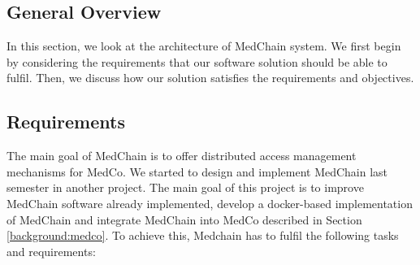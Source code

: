 \subsection{General Overview} \label{arch:general Overview}
In this section, we look at the architecture of MedChain system. We first begin by considering the requirements that our software solution should be able to fulfil. Then, we discuss how our solution satisfies the requirements and objectives. 




\subsection{Requirements} \label{arch:requirements}

The main goal of MedChain is to offer distributed access management mechanisms for MedCo. We started to design and implement MedChain last semester in another project. The main goal of this project is to improve MedChain software already implemented, develop a docker-based implementation of MedChain and integrate MedChain into MedCo described in Section \ref{background:medco}. To achieve this, Medchain has to fulfil the following tasks and requirements:


